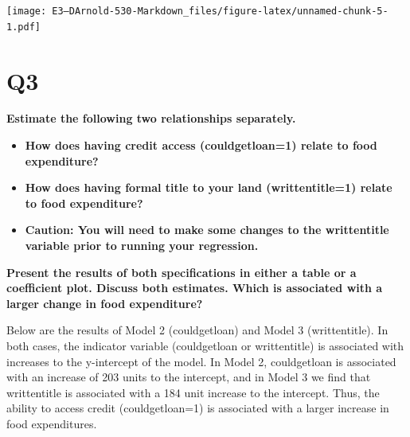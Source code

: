 \documentclass[
]{article}
\begin{document}
\texttt{[image: E3---DArnold-530-Markdown\_files/figure-latex/unnamed-chunk-5-1.pdf]}\\

\hfill\break

\hfill\break

\hypertarget{q3}{%
\section{Q3}\label{q3}}

\textbf{Estimate the following two relationships separately.}

\begin{itemize}
\item
  \textbf{How does having credit access (couldgetloan=1) relate to food
  expenditure?}
\item
  \textbf{How does having formal title to your land (writtentitle=1)
  relate to food expenditure?}
\item
  \textbf{Caution: You will need to make some changes to the
  writtentitle variable prior to running your regression. }
\end{itemize}

\hfill\break

\textbf{Present the results of both specifications in either a table or
a coefficient plot. Discuss both estimates. Which is associated with a
larger change in food expenditure?}

\hfill\break
Below are the results of Model 2 (couldgetloan) and Model 3
(writtentitle). In both cases, the indicator variable (couldgetloan or
writtentitle) is associated with increases to the y-intercept of the
model. In Model 2, couldgetloan is associated with an increase of 203
units to the intercept, and in Model 3 we find that writtentitle is
associated with a 184 unit increase to the intercept. Thus, the ability
to access credit (couldgetloan=1) is associated with a larger increase
in food expenditures.\\
\end{document}
